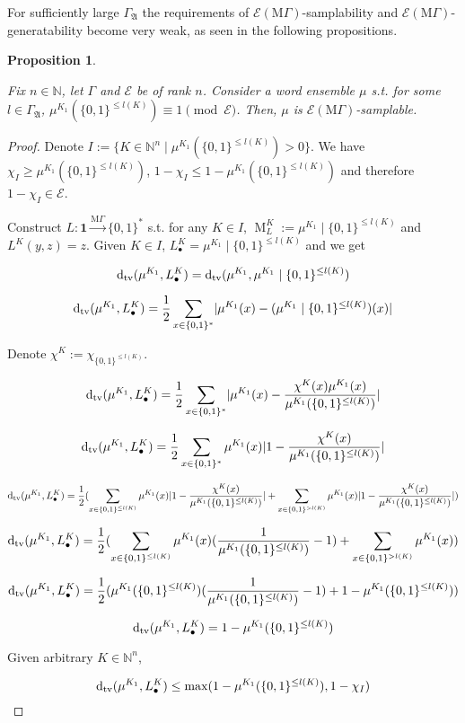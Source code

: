 \documentclass{article}
\numberwithin{equation}{section}
\theoremstyle{definition}
\theoremstyle{plain}
\newtheorem{proposition}{Proposition}[section]
\newcommand{\Bool}{\{0,1\}}
\newcommand{\Words}{{\Bool^*}}
\newcommand{\WordsLen}[1]{{\Bool^{#1}}}
\DeclareMathOperator{\M}{M}
\newcommand{\Dtv}{\operatorname{d}_{\textnormal{tv}}}
\newcommand{\Nats}{\mathbb{N}}
\newcommand{\Abs}[1]{\lvert #1 \rvert}
\newcommand{\GrowA}{\Gamma_{\mathfrak{A}}}
\newcommand{\MGrow}{\mathrm{M}\Gamma}
\newcommand{\Fall}{\mathcal{E}}
\newcommand{\MScheme}{\xrightarrow{\MGrow}}
\begin{document}
For sufficiently large $\GrowA$ the requirements of $\Fall(\MGrow)$-samplability and $\Fall(\MGrow)$-generatability become very weak, as seen in the following propositions.

\begin{samepage}
\begin{proposition}
\label{prp:adv_mgamma_smp}

Fix $n \in \Nats$, let $\Gamma$ and $\Fall$ be of rank $n$. Consider a word ensemble $\mu$ s.t. for some $l \in \GrowA$, $\mu^{K_1}(\Bool^{\leq l(K)}) \equiv 1 \pmod \Fall$. Then, $\mu$ is $\Fall(\MGrow)$-samplable.

\end{proposition}
\end{samepage}

\begin{proof}

Denote $I:=\{K \in \Nats^n \mid \mu^{K_1}(\Bool^{\leq l(K)}) > 0\}$. We have $\chi_I \geq \mu^{K_1}(\Bool^{\leq l(K)})$, $1 - \chi_I \leq 1 - \mu^{K_1}(\Bool^{\leq l(K)})$ and therefore $1 - \chi_I \in \Fall$.

Construct ${L: \bm{1} \MScheme \Words}$ s.t. for any $K \in I$, $\M_L^K:=\mu^{K_1} \mid \Bool^{\leq l(K)}$ and ${L^K(y,z)=z}$. Given $K \in I$, ${L_\bullet^K = \mu^{K_1} \mid \Bool^{\leq l(K)}}$ and we get

$$\Dtv(\mu^{K_1}, L_\bullet^K) = \Dtv(\mu^{K_1}, \mu^{K_1} \mid \Bool^{\leq l(K)})$$

$$\Dtv(\mu^{K_1}, L_\bullet^K) = \frac{1}{2} \sum_{x \in \Words} \Abs{\mu^{K_1}(x)-(\mu^{K_1} \mid \WordsLen{\leq l(K)})(x)}$$

Denote $\chi^K:=\chi_{\WordsLen{\leq l(K)}}$.

$$\Dtv(\mu^{K_1}, L_\bullet^K) = \frac{1}{2} \sum_{x \in \Words} \Abs{\mu^{K_1}(x)-\frac{\chi^K(x)\mu^{K_1}(x)}{\mu^{K_1}(\WordsLen{\leq l(K)})}}$$

$$\Dtv(\mu^{K_1}, L_\bullet^K) = \frac{1}{2} \sum_{x \in \Words} \mu^{K_1}(x) \Abs{1-\frac{\chi^K(x)}{\mu^{K_1}(\Bool^{\leq l(K)})}}$$

$$\Dtv(\mu^{K_1}, L_\bullet^K) = \frac{1}{2} (\sum_{x \in \Bool^{\leq l(K)}} \mu^{K_1}(x) \Abs{1-\frac{\chi^K(x)}{\mu^{K_1}(\Bool^{\leq l(K)})}}+\sum_{x \in \Bool^{>l(K)}} \mu^{K_1}(x) \Abs{1-\frac{\chi^K(x)}{\mu^{K_1}(\Bool^{\leq l(K)})}})$$

$$\Dtv(\mu^{K_1}, L_\bullet^K) = \frac{1}{2} (\sum_{x \in \Bool^{\leq l(K)}} \mu^{K_1}(x)(\frac{1}{\mu^{K_1}(\Bool^{\leq l(K)})}-1)+\sum_{x \in \Bool^{>l(K)}} \mu^{K_1}(x))$$

$$\Dtv(\mu^{K_1}, L_\bullet^K) = \frac{1}{2} (\mu^{K_1}(\Bool^{\leq l(K)})(\frac{1}{\mu^{K_1}(\Bool^{\leq l(K)})}-1)+1 - \mu^{K_1}(\Bool^{\leq l(K)}))$$

$$\Dtv(\mu^{K_1}, L_\bullet^K) = 1-\mu^{K_1}(\Bool^{\leq l(K)})$$

Given arbitrary $K \in \Nats^n$,

$$\Dtv(\mu^{K_1}, L_\bullet^K) \leq \max(1-\mu^{K_1}(\Bool^{\leq l(K)}), 1-\chi_I)$$

\end{proof}
\end{document}
